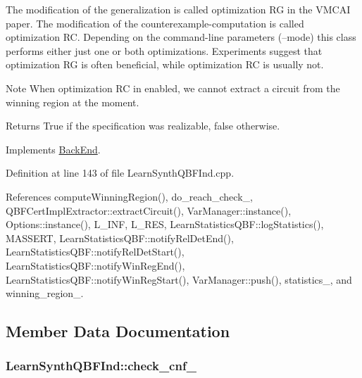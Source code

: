 The modification of the generalization is called optimization R\-G in the V\-M\-C\-A\-I paper. The modification of the counterexample-\/computation is called optimization R\-C. Depending on the command-\/line parameters (--mode) this class performs either just one or both optimizations. Experiments suggest that optimization R\-G is often beneficial, while optimization R\-C is usually not.

\begin{DoxyNote}{Note}
When optimization R\-C in enabled, we cannot extract a circuit from the winning region at the moment. 
\end{DoxyNote}
\begin{DoxyReturn}{Returns}
True if the specification was realizable, false otherwise. 
\end{DoxyReturn}


Implements \hyperlink{classBackEnd_a099e717dc71e9cc2d838b1ca86340590}{Back\-End}.



Definition at line 143 of file Learn\-Synth\-Q\-B\-F\-Ind.\-cpp.



References compute\-Winning\-Region(), do\-\_\-reach\-\_\-check\-\_\-, Q\-B\-F\-Cert\-Impl\-Extractor\-::extract\-Circuit(), Var\-Manager\-::instance(), Options\-::instance(), L\-\_\-\-I\-N\-F, L\-\_\-\-R\-E\-S, Learn\-Statistics\-Q\-B\-F\-::log\-Statistics(), M\-A\-S\-S\-E\-R\-T, Learn\-Statistics\-Q\-B\-F\-::notify\-Rel\-Det\-End(), Learn\-Statistics\-Q\-B\-F\-::notify\-Rel\-Det\-Start(), Learn\-Statistics\-Q\-B\-F\-::notify\-Win\-Reg\-End(), Learn\-Statistics\-Q\-B\-F\-::notify\-Win\-Reg\-Start(), Var\-Manager\-::push(), statistics\-\_\-, and winning\-\_\-region\-\_\-.



\subsection{Member Data Documentation}
\hypertarget{classLearnSynthQBFInd_ac90a4574da82c96888db219291368554}{
\subsubsection[{check\-\_\-cnf\-\_\-}]{ Learn\-Synth\-Q\-B\-F\-Ind\-::check\-\_\-cnf\-\_\-\hspace{0.3cm}{\ttfamily [protected]}}}\label{classLearnSynthQBFInd_ac90a4574da82c96888db219291368554}


